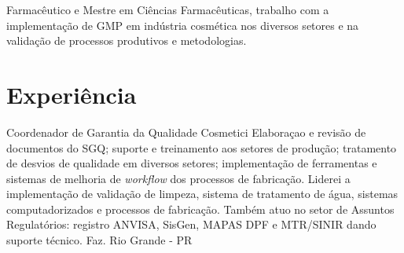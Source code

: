 
\begin{center}
    \small
    Farmacêutico e Mestre em Ciências Farmacêuticas,
    trabalho com a implementação de GMP em indústria cosmética 
    nos diversos setores e na validação de processos produtivos
    e metodologias.
\end{center}
    


\section{Experiência}


{Coordenador de Garantia da Qualidade}
{Cosmetici}
{   
     Elaboraçao e revisão de documentos do SGQ;
     suporte e treinamento aos setores de produção;
     tratamento de desvios de qualidade em diversos setores;
     implementação de ferramentas e sistemas de melhoria de \emph{workflow}
     dos processos de fabricação.
     Liderei a implementação de validação de limpeza, sistema de tratamento de água,
     sistemas computadorizados e processos de fabricação.
     Também atuo no setor de Assuntos Regulatórios:
     registro ANVISA, SisGen, MAPAS DPF e MTR/SINIR
     dando suporte técnico.
}
{Faz. Rio Grande - PR}




